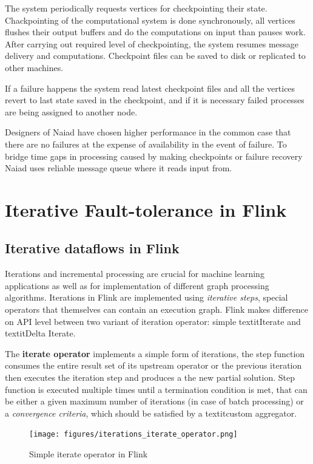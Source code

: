 The system periodically requests vertices for checkpointing their state. Chackpointing of the computational system is done synchronously,  all vertices flushes their output buffers and do the computations on input than pauses work. After carrying out required level of checkpointing, the system resumes message delivery and computations. Checkpoint files can be saved to disk or replicated to other machines.

If a failure happens the system read latest checkpoint files and  all the vertices revert to last state saved in the checkpoint, and if it is necessary failed processes are being assigned to another node.

Designers of Naiad have chosen higher performance in the common case that there are no failures at the expense of availability in the event of failure. To bridge time gaps in processing caused by making checkpoints or failure recovery Naiad uses reliable message queue where it reads input from. 

\section{Iterative Fault-tolerance in Flink}
\subsection{Iterative dataflows in Flink}
Iterations and incremental processing are crucial for machine learning applications as well as for implementation of different graph processing algorithms. Iterations in Flink are implemented using \textit{iterative steps}, special operators that themselves can contain an execution graph. Flink makes difference on API level between two variant of iteration operator: simple textit{Iterate} and textit{Delta Iterate}.

The \textbf{iterate operator} implements a simple form of iterations, the step function consumes the entire result set of its upstream operator or the previous iteration then executes the iteration step and produces a the new partial solution. Step function is executed multiple times until a termination condition is met, that can be either a given maximum number of iterations (in case of batch processing) or a \textit{convergence criteria}, which should be satisfied by a textit{custom aggregator}.
\begin{figure}[!ht]
  \centering    
      \texttt{[image: figures/iterations\_iterate\_operator.png]}
  \caption{Simple iterate operator in Flink\cite{flink_doc_iteration}}
  \label{fig:iterations_iterate_operator}
\end{figure}

